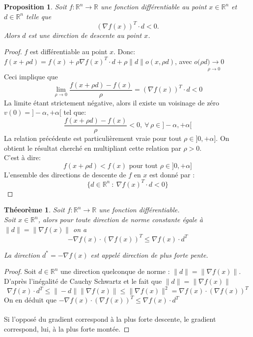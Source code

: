 \documentclass[12pt,a4paper,openay]{book}
\numberwithin{equation}{chapter}
\newtheorem{theo}{Th\'eeor\`eme}[chapter]
\newtheorem{prop}{Proposition}[chapter]
\newcommand{\R}{\mathbb{R}}
\newcommand{\gf}{\nabla f(x)}
\let\oldforall\forall
\renewcommand{\forall}{\oldforall\,}
\begin{document}
	\begin{prop}
		Soit $f :\R^n \to \R$ une fonction diff\'erentiable au point $x\in\R^n$ et $d\in \R^n$ telle que 
		$$ \left(\nabla f(x)\right)^T\cdot d<0.  $$		
		Alors $d$ est une direction de descente au point $x$.		
	\end{prop}
	\begin{proof}
		$f$ est diff\'erentiable au point $x$. Donc:\\
		$f\left(x+\rho d\right)= f\left(x\right)+\rho\nabla f\left(x\right)^T\cdot d+ \rho\|d\|o\left(x,\rho d\right)$, avec $o(\rho \underset{\rho\to 0}{d)\to 0}$\\
		Ceci implique que 
		$$ \underset{\rho \to 0}{\lim} \frac{f\left(x+\rho d\right)-f\left(x\right)}{\rho} = \left(\nabla f(x)\right)^T\cdot d<0$$
		La limite \'etant strictement n\'egative, alors il existe un voisinage de z\'ero $v(0)=]-\alpha,+\alpha [$ tel que:
		$$ \frac{f\left(x+\rho d\right)-f\left(x\right)}{\rho}<0,\ \forall \rho\in ]-\alpha,+\alpha [$$
		La relation pr\'ec\'edente est particuli\`erement vraie pour tout $\rho\in ]0,+\alpha].$ On obtient le r\'esultat cherch\'e en multipliant cette relation par $\rho >0$.\\
		C'est \`a dire: 
		$$f\left(x+\rho d\right)<f\left(x\right) \text{ pour tout } \rho\in ]0,+\alpha]$$
		L'ensemble des directions de descente de $f$ en $x$ est donn\'e par : 
		$$ \{ d\in \R^n \ : \ \nabla f\left(x\right)^T\cdot d<0\}  $$
	\end{proof}	
		
		
	\begin{theo}
		Soit $f :\R^n \to \R$ une fonction diff\'erentiable.\\
		Soit $x\in\R^n$, alors pour toute direction de norme constante \'egale \`a $\|d\|=\|\nabla f(x)\|$ on a 
		$$-\gf \cdot \left(\nabla f(x)\right)^T\leq \gf\cdot d^T$$
		
		La direction $d^*=-\gf$ est appel\'e direction de plus forte pente.
	\end{theo}

	\begin{proof}
		\hfill
		
		Soit $d\in\R^n$ une direction quelconque de norme : $\|d\|=\|\gf\|$.\\
		D'apr\`es l'in\'egalit\'e de Cauchy Schwartz et le fait que $\|d\|=\|\gf\|$
		$$ \gf\cdot d^T \leq \|-d\|\|\gf\| \leq \|\gf\|^2 = \gf \cdot \left(\nabla f(x)\right)^T$$
		On en d\'eduit que $ -\gf \cdot \left(\nabla f(x)\right)^T\leq \gf\cdot d^T$\\\\
		Si l'oppos\'e du gradient correspond \`a la plus forte descente, le gradient correspond, lui, \`a la plus forte mont\'ee.
	\end{proof}
	
\end{document}

